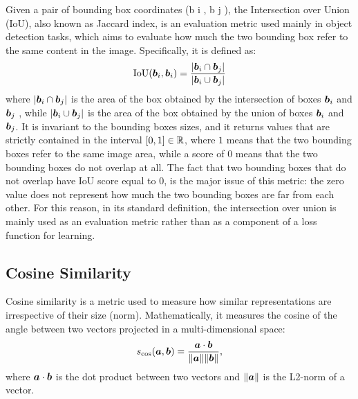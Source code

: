 Given a pair of bounding box coordinates (b i , b j ), the
Intersection over Union (IoU), also known as Jaccard index, is an evaluation metric used mainly in object detection
tasks, which aims to evaluate how much the two bounding
box refer to the same content in the image. Specifically, it
is defined as:
\[
  \text{IoU}(\bm{b}_i, \bm{b}_i) = \frac{| \bm{b}_i \cap \bm{b}_j |}{| \bm{b}_i \cup \bm{b}_j |}
\]
where $| \bm{b}_i \cap \bm{b}_j |$ is the area of the box obtained by
the intersection of boxes $\bm{b}_i$ and $\bm{b}_j$ , while $| \bm{b}_i
\cup \bm{b}_j |$ is the area of the box obtained by the union of
boxes $\bm{b}_i$ and $\bm{b}_j$. It is invariant to the bounding boxes
sizes, and it returns values that are strictly contained in the
interval $[0, 1] \in \mathbb{R}$, where $1$ means that the two bounding
boxes refer to the same image area, while a score of $0$ means that
the two bounding boxes do not overlap at all. The fact that two
bounding boxes that do not overlap have IoU score equal to $0$, is the
major issue of this metric: the zero value does not represent how much
the two bounding boxes are far from each other. For this reason, in
its standard definition, the intersection over union is mainly used as
an evaluation metric rather than as a component of a loss function for
learning.

\subsection{Cosine Similarity}

Cosine similarity is a metric used to measure how similar
representations are irrespective of their size (norm). Mathematically,
it measures the cosine of the angle between two vectors projected in a
multi-dimensional space:
\begin{equation}
  s_{\cos}(\bm{a}, \bm{b}) = \frac{\bm{a} \cdot \bm{b}}{\| \bm{a} \| \| \bm{b} \|},
\end{equation}
where $\bm{a} \cdot \bm{b}$ is the dot product between two vectors and
$\| \bm{a} \|$ is the L2-norm of a vector.

